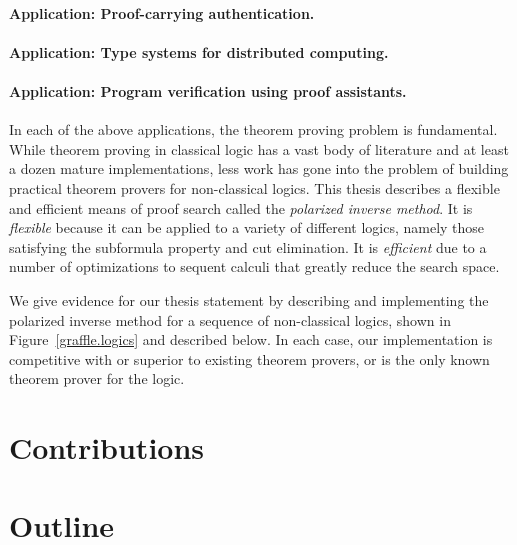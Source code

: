 \paragraph{Application: Proof-carrying authentication.}

\paragraph{Application: Type systems for distributed computing.}


\paragraph{Application: Program verification using proof assistants.}

In each of the above applications, the theorem proving problem is fundamental.
While theorem proving in classical logic has a vast body of literature and at
least a dozen mature implementations, less work has gone into the problem of
building practical theorem provers for non-classical logics.  This thesis
describes a flexible and efficient means of proof search called the
\emph{polarized inverse method}.  It is \emph{flexible} because it can be
applied to a variety of different logics, namely those satisfying the subformula
property and cut elimination.  It is \emph{efficient} due to a number of
optimizations to sequent calculi that greatly reduce the search space.

We give evidence for our thesis statement by describing and implementing the
polarized inverse method for a sequence of non-classical logics, shown in
Figure~\ref{graffle.logics}
and described
below.  In each case, our implementation is competitive with or superior to
existing theorem provers, or is the only known theorem prover for the logic.

\section{Contributions}

\section{Outline}
% 

